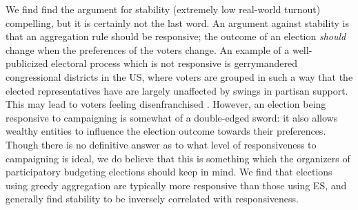 \documentclass[mnsc,blindrev]{informs3_freeuse} %
\newcommand{\knap}{\textsc{Knap}}
\newcommand{\mes}{ES}
\begin{document}
We find find the argument for stability (extremely low real-world turnout) compelling, but it is certainly not the last word. An argument against stability is that an aggregation rule should be responsive;  the outcome of an election \emph{should} change when the preferences of the voters change.  An example of a well-publicized electoral process which is not responsive is gerrymandered congressional districts in the US, where voters are grouped in such a way that the elected representatives have are largely unaffected by swings in partisan support. This may lead to voters feeling disenfranchised .
However, an election being responsive to campaigning is somewhat of a double-edged sword: it also allows wealthy entities to influence the election outcome towards their preferences. 
Though there is no definitive answer as to what level of responsiveness to campaigning is ideal, we do believe that this is something which the organizers of participatory budgeting elections should keep in mind. 
We find that elections using greedy aggregation are  typically more responsive  than those using \mes, and generally find stability to be inversely correlated with  responsiveness.



\end{document}
